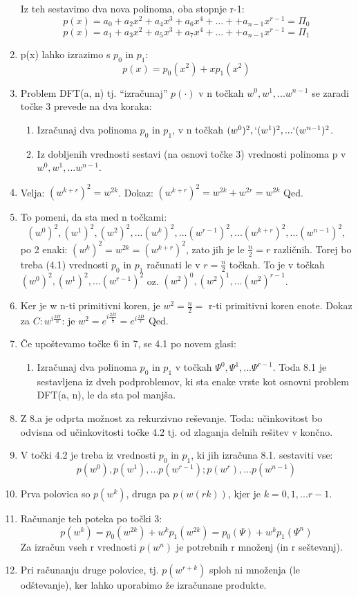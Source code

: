 \documentclass[a4paper,10pt]{article}
\begin{document}
\begin{enumerate}
Iz teh sestavimo dva nova polinoma, oba stopnje r-1:
$$p(x) = a_{0} + a_{2}x^{2} + a_{4}x^{3} + a_{6}x^{4} + \ldots + + a_{n-1}x^{r-1} = \Pi_{0}$$
$$p(x) = a_{1} + a_{3}x^{2} + a_{5}x^{3} + a_{7}x^{4} + \ldots + + a_{n-1}x^{r-1} = \Pi_{1}$$
\item p(x) lahko izrazimo s $p_0$ in $p_1$:
$$p(x) = p_0(x^2) + xp_1(x^2)$$
\item Problem DFT(a, n) tj. “izra\v cunaj” $p(\cdot)$ v n to\v ckah $w^0, w^1,... w^{n-1}$ se zaradi to\v cke 3 prevede na dva koraka:
	\begin{enumerate}
	\item Izra\v cunaj dva polinoma $p_0$ in $p_1$, v n to\v ckah $( w^{0} )^{2}, `(w^{1})^{2},...`(w^{n-1})^{2}$.
	\item Iz dobljenih vrednosti sestavi (na osnovi to\v cke 3) vrednosti polinoma p v $w^0, w^1,... w^{n-1}$.
	\end{enumerate}
\item Velja: $(w^{k+r})^2 = w^{2k}$. Dokaz: $(w^{k+r})^2 = w^{2k} + w^{2r} = w^{2k}$ Qed.
\item To pomeni, da sta med n to\v ckami:
$$
(w^{0})^{2},  (w^{1})^{2},  (w^{2})^{2},  ... (w^{k})^{2},  ... (w^{r-1})^{2},  ...(w^{k+r})^{2},...  (w^{n-1})^{2},
$$po 2 enaki: $(w^{k})^{2} = w^{2k} = (w^{k+r})^{2}$, zato jih je le $\frac{n}{2} = r$ razli\v cnih. Torej bo treba (4.1) vrednosti $p_0$ in $p_1$ ra\v cunati le v $r = \frac{n}{2}$ to\v ckah. To je v to\v ckah $(w^0)^2, (w^1)^2,... (w^{r-1})^2$ oz. $(w^2)^0, (w^2)^1,... (w^2)^{r-1}$.
\item Ker je w n-ti primitivni koren, je $w^{2} = \frac{n}{2} =$ r-ti primitivni koren enote.
Dokaz za $C: w^{i \frac{2\Pi}{n}}$: je $w^2 = e^{i \frac{2\Pi}{\frac{n}{2}}} = e^{i\frac{2\Pi}{r}}$ Qed.
\item \v Ce upo\v stevamo to\v cke 6 in 7, se 4.1 po novem glasi:
\begin{enumerate}
\item Izra\v cunaj dva polinoma $p_0$ in $p_1$ v to\v ckah $\Psi ^0, \Psi ^1,... \Psi ^{r-1}$. Toda 8.1 je sestavljena iz dveh podproblemov, ki sta enake vrste kot osnovni problem DFT(a, n), le da sta pol manj\v sa.
\end{enumerate}
\item Z 8.a je odprta mo\v znost za rekurzivno re\v sevanje. Toda: u\v cinkovitost bo odvisna od u\v cinkovitosti to\v cke 4.2 tj. od zlaganja delnih re\v sitev v kon\v cno.
\item V to\v cki 4.2 je treba iz vrednosti $p_0$ in $p_1$, ki jih izra\v cuna 8.1. sestaviti vse:
$$p(w^0), p(w^1), ... p(w^{r-1}); p(w^r),... p(w^{n-1})$$
\item Prva polovica so $p(w^k)$, druga pa $p(w(rk))$, kjer je $k=0, 1,... r-1$.
\item Ra\v cunanje teh poteka po to\v cki 3:
$$
p(w^k) = p_0(w^{2k}) + w^kp_1(w^{2k}) = p_0(\Psi) + w^kp_1(\Psi ^n)
$$
Za izra\v cun vseh r vrednosti $p(w^n)$ je potrebnih r mno\v zenj (in r se\v stevanj).
\item Pri ra\v cunanju druge polovice, tj. $p(w^{r+k})$ sploh ni mno\v zenja (le od\v stevanje), ker lahko uporabimo \v ze izra\v cunane produkte.
\end{enumerate}
\end{document}
